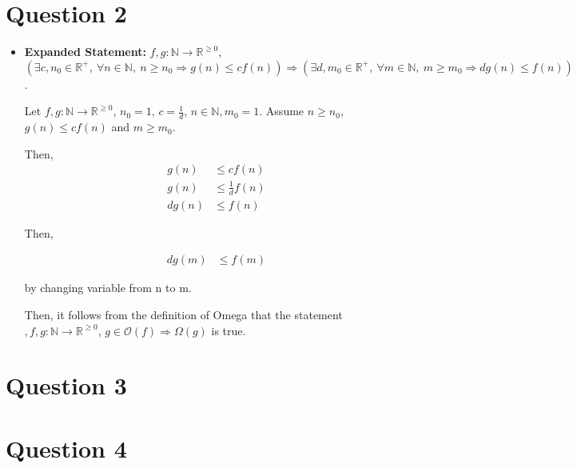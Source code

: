 \documentclass[12pt]{article}
\begin{document}
\section*{Question 2}
\begin{itemize}
    \item

    \textbf{Expanded Statement:} $f,g:\mathbb{N} \to \mathbb{R}^{\geq 0}$,
    $(\exists c,n_0 \in \mathbb{R}^{+},\:\forall n \in \mathbb{N},\:n \geq n_0
    \Rightarrow g(n) \leq cf(n)) \Rightarrow (\exists d,m_0 \in \mathbb{R}^{+},\:
    \forall m \in \mathbb{N},\: m \geq m_0 \Rightarrow dg(n) \leq f(n))$.

    \bigskip

    Let $f,g: \mathbb{N} \to \mathbb{R}^{\geq 0}$, $n_0 = 1$, $c = \frac{1}{d}$,
    $n \in \mathbb{N}, m_0 = 1$. Assume $n \geq n_0$, $g(n) \leq cf(n)$ and
    $m \geq m_0$.

    \bigskip

    Then,
    \setcounter{equation}{0}
    \begin{align}
        g(n) &\leq cf(n)\\
        g(n) &\leq \frac{1}{d}f(n)\\
        dg(n) &\leq f(n)
    \end{align}

    \bigskip

    Then,

    \begin{align}
        dg(m) &\leq f(m)
    \end{align}

    by changing variable from n to m.

    \bigskip

    Then, it follows from the definition of Omega that the statement
    $,f,g: \mathbb{N} \to \mathbb{R}^{\geq 0}$, $g \in \mathcal{O}(f) \Rightarrow
    \Omega (g)$ is true.

\end{itemize}

\section*{Question 3}

\section*{Question 4}
\end{document}
